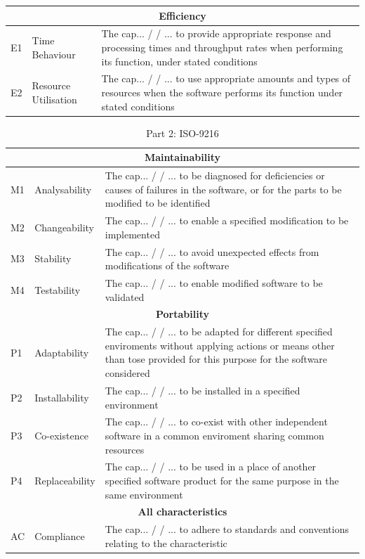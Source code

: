 \documentclass{cslthse-msc}
\begin{document}
\begin{table}[H]
\begin{tabularx}{\columnwidth}{|l|l|X|}
            \multicolumn{3}{c}{\textbf{Efficiency}} \\ \hline
            E1&Time Behaviour & The cap... / / ... to provide appropriate response and processing times and
            throughput rates when performing its function, under stated conditions \\ \hline
            E2&Resource Utilisation & The cap... / / ... to use appropriate amounts and types of resources when the software
            performs its function under stated conditions \\ \hline
        \end{tabularx}
    \end{table}

    \begin{table}[H]
        \centering
        \caption{Part 2: ISO-9216}
        \label{tabl:standard2}
        \begin{tabularx}{\columnwidth}{|l|l|X|}
            \hline
            \multicolumn{3}{c}{\textbf{Maintainability}} \\ \hline
            M1&Analysability & The cap... / / ... to be diagnosed for deficiencies or causes of failures in the
            software, or for the parts to be modified to be identified \\ \hline
            M2&Changeability & The cap... / / ... to enable a specified modification to be implemented \\ \hline
            M3&Stability & The cap... / / ... to avoid unexpected effects from modifications of the software \\ \hline
            M4&Testability &The cap... / / ... to enable modified software to be validated \\ \hline

            \multicolumn{3}{c}{\textbf{Portability}} \\ \hline
            P1& Adaptability &The cap... / / ... to be adapted for different specified enviroments without applying
            actions or means other than tose provided for this purpose for the software considered \\ \hline
            P2&Installability& The cap... / / ... to be installed in a specified environment \\ \hline
            P3&Co-existence &The cap... / / ... to co-exist with other independent software in a common enviroment sharing
            common resources \\ \hline
            P4&Replaceability &The cap... / / ... to be used in a place of another specified software product for the same
            purpose in the same environment \\ \hline

            \multicolumn{3}{c}{\textbf{All characteristics}} \\ \hline
            AC&Compliance & The cap... / / ... to adhere to standards and conventions relating to the
            characteristic \\ \hline
        \end{tabularx}
    \end{table}
\end{document}
